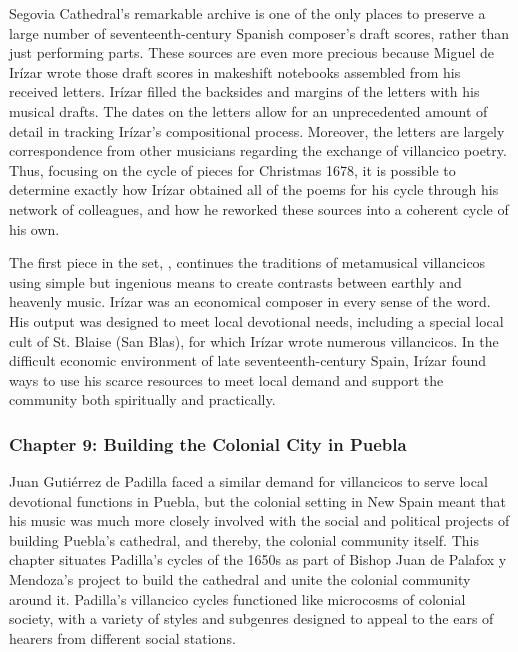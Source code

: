 \documentclass{vcbook-proposal}
\begin{document}
Segovia Cathedral's remarkable archive is one of the only places to preserve a large number of seventeenth-century Spanish composer's draft scores, rather than just performing parts.
These sources are even more precious because Miguel de Irízar wrote those draft scores in makeshift notebooks assembled from his received letters.
Irízar filled the backsides and margins of the letters with his musical drafts.
The dates on the letters allow for an unprecedented amount of detail in tracking Irízar's compositional process.
Moreover, the letters are largely correspondence from other musicians regarding the exchange of villancico poetry.
Thus, focusing on the cycle of pieces for Christmas 1678, it is possible to determine exactly how Irízar obtained all of the poems for his cycle through his network of colleagues, and how he reworked these sources into a coherent cycle of his own.

The first piece in the set, , continues the traditions of metamusical villancicos using simple but ingenious means to create contrasts between earthly and heavenly music.
Irízar was an economical composer in every sense of the word.
His output was designed to meet local devotional needs, including a special local cult of St. Blaise (San Blas), for which Irízar wrote numerous villancicos. 
In the difficult economic environment of late seventeenth-century Spain, Irízar found ways to use his scarce resources to meet local demand and support the community both spiritually and practically.

\subsubsection{Chapter 9: Building the Colonial City in Puebla}

Juan Gutiérrez de Padilla faced a similar demand for villancicos to serve local devotional functions in Puebla, but the colonial setting in New Spain meant that his music was much more closely involved with the social and political projects of building Puebla's cathedral, and thereby, the colonial community itself.
This chapter situates Padilla's cycles of the 1650s as part of Bishop Juan de Palafox y Mendoza's project to build the cathedral and unite the colonial community around it.
Padilla's villancico cycles functioned like microcosms of colonial society, with a variety of styles and subgenres designed to appeal to the ears of hearers from different social stations.
\end{document}
